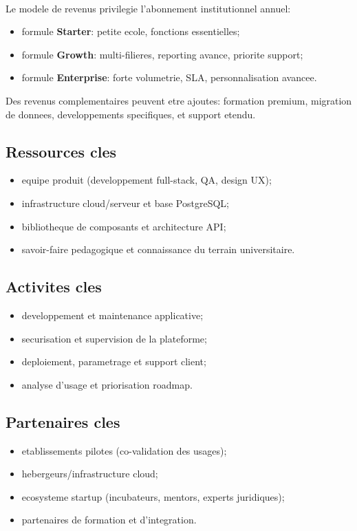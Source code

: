 ﻿﻿\documentclass[12pt,a4paper,oneside]{report}
\begin{document}
Le modele de revenus privilegie l'abonnement institutionnel annuel:
\begin{itemize}
  \item formule \textbf{Starter}: petite ecole, fonctions essentielles;
  \item formule \textbf{Growth}: multi-filieres, reporting avance, priorite support;
  \item formule \textbf{Enterprise}: forte volumetrie, SLA, personnalisation avancee.
\end{itemize}

Des revenus complementaires peuvent etre ajoutes: formation premium, migration de donnees, developpements specifiques, et support etendu.

\subsection{Ressources cles}

\begin{itemize}
  \item equipe produit (developpement full-stack, QA, design UX);
  \item infrastructure cloud/serveur et base PostgreSQL;
  \item bibliotheque de composants et architecture API;
  \item savoir-faire pedagogique et connaissance du terrain universitaire.
\end{itemize}

\subsection{Activites cles}

\begin{itemize}
  \item developpement et maintenance applicative;
  \item securisation et supervision de la plateforme;
  \item deploiement, parametrage et support client;
  \item analyse d'usage et priorisation roadmap.
\end{itemize}

\subsection{Partenaires cles}

\begin{itemize}
  \item etablissements pilotes (co-validation des usages);
  \item hebergeurs/infrastructure cloud;
  \item ecosysteme startup (incubateurs, mentors, experts juridiques);
  \item partenaires de formation et d'integration.
\end{itemize}
\end{document}
